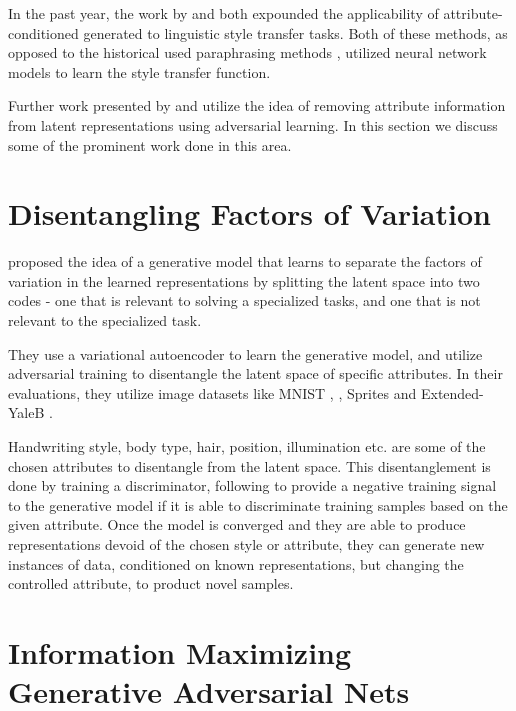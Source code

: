 In the past year, the work by \cite{hu2017toward} and \cite{ficler2017controlling} both expounded the applicability of attribute-conditioned generated to linguistic style transfer tasks. Both of these methods, as opposed to the historical used paraphrasing methods \citep{xu2012paraphrasing}, utilized neural network models \citep{lecun2015deep} to learn the style transfer function.

Further work presented by \cite{shen2017style} and \cite{fu2017style} utilize the idea of removing attribute information from latent representations using adversarial learning. In this section we discuss some of the prominent work done in this area.

\section{Disentangling Factors of Variation}

\cite{mathieu2016disentangling} proposed the idea of a generative model that learns to separate the factors of variation in the learned representations by splitting the latent space into two codes - one that is relevant to solving a specialized tasks, and one that is not relevant to the specialized task.

They use a variational autoencoder to learn the generative model, and utilize adversarial training to disentangle the latent space of specific attributes. In their evaluations, they utilize image datasets like MNIST \citep{lecun2010mnist},
\citep{lecun2004learning}, Sprites \citep{reed2015deep} and Extended-YaleB \citep{georghiades2001few}.

Handwriting style, body type, hair, position, illumination etc. are some of the chosen attributes to disentangle from the latent space. This disentanglement is done by training a discriminator, following \cite{goodfellow2014generative} to provide a negative training signal to the generative model if it is able to discriminate training samples based on the given attribute. Once the model is converged and they are able to produce representations devoid of the chosen style or attribute, they can generate new instances of data, conditioned on known representations, but changing the controlled attribute, to product novel samples.


\section{Information Maximizing Generative Adversarial Nets}

